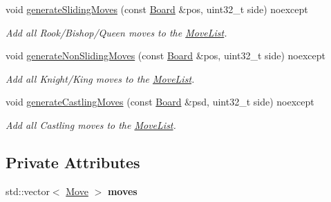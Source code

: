 \begin{DoxyCompactItemize}
void \mbox{\hyperlink{classMoveList_a631546d45818cb40c204dde6fa368ea8}{generate\+Sliding\+Moves}} (const \mbox{\hyperlink{classBoard}{Board}} \&pos, uint32\+\_\+t side) noexcept
\begin{DoxyCompactList}\small\item\em Add all Rook/\+Bishop/\+Queen moves to the \mbox{\hyperlink{classMoveList}{Move\+List}}. \end{DoxyCompactList}\item 
void \mbox{\hyperlink{classMoveList_a56da1abbedf5d6c23b1e321740ecfae9}{generate\+Non\+Sliding\+Moves}} (const \mbox{\hyperlink{classBoard}{Board}} \&pos, uint32\+\_\+t side) noexcept
\begin{DoxyCompactList}\small\item\em Add all Knight/\+King moves to the \mbox{\hyperlink{classMoveList}{Move\+List}}. \end{DoxyCompactList}\item 
void \mbox{\hyperlink{classMoveList_ae0f3fcb8d21bf22c9e7509308d5fc9fe}{generate\+Castling\+Moves}} (const \mbox{\hyperlink{classBoard}{Board}} \&psd, uint32\+\_\+t side) noexcept
\begin{DoxyCompactList}\small\item\em Add all Castling moves to the \mbox{\hyperlink{classMoveList}{Move\+List}}. \end{DoxyCompactList}\end{DoxyCompactItemize}
\subsection*{Private Attributes}
\begin{DoxyCompactItemize}
\item 
\mbox{\label{classMoveList_a9e368dbdc56fb19ee74dffb617ce563a}} 
std\+::vector$<$ \mbox{\hyperlink{classMove}{Move}} $>$ {\bfseries moves}
\end{DoxyCompactItemize}
